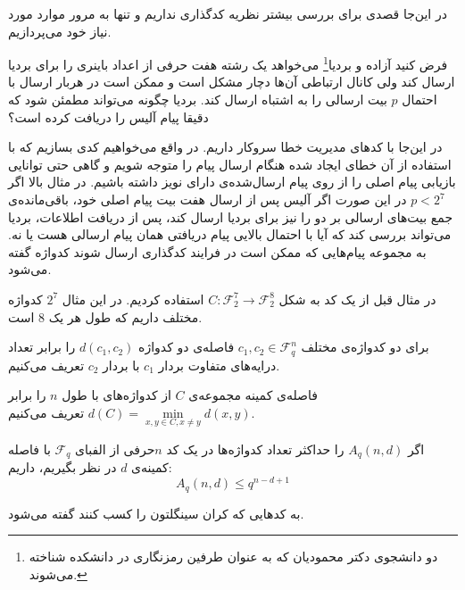 در این‌جا قصدی برای بررسی بیشتر نظریه کدگذاری نداریم و تنها به مرور موارد مورد نیاز خود می‌پردازیم.
\begin{example}
	فرض کنید آزاده و بردیا\footnote{دو دانشجوی دکتر محمودیان که به عنوان طرفین رمزنگاری در دانشکده شناخته می‌شوند.}
	 می‌خواهد یک رشته هفت حرفی از اعداد باینری را برای بردیا ارسال کند ولی کانال ارتباطی آن‌ها دچار مشکل است و ممکن است در هربار ارسال با احتمال
	$p$
	بیت ارسالی را به اشتباه ارسال کند. بردیا چگونه می‌تواند مطمئن شود که دقیقا پیام آلیس را دریافت کرده است؟
	
	در این‌جا با کدهای مدیریت خطا سروکار داریم. در واقع می‌خواهیم کدی بسازیم که با استفاده از آن خطای ایجاد شده هنگام ارسال پیام را متوجه شویم و گاهی حتی توانایی بازیابی پیام اصلی را از روی پیام ارسال‌شده‌ی دارای نویز داشته باشیم. در مثال بالا اگر
	$p < 2^7$
	در این صورت اگر آلیس پس از ارسال هفت بیت پیام اصلی خود، باقی‌مانده‌ی جمع بیت‌های ارسالی بر دو را نیز برای بردیا ارسال کند، پس از دریافت اطلاعات، بردیا می‌تواند بررسی کند که آیا با احتمال بالایی پیام دریافتی همان پیام ارسالی هست یا نه. به مجموعه‌ پیام‌هایی که ممکن است در فرایند کدگذاری ارسال شوند کدواژه گفته می‌شود.
	
	در مثال قبل از یک کد به شکل
	$C: \mathcal{F}_2^7 \rightarrow \mathcal{F}_2^8$
	استفاده کردیم. در این مثال
	$2^7$
	کدواژه مختلف داریم که طول هر یک
	$8$
	است.
\end{example}

\begin{definition}
	برای دو کدواژه‌ی مختلف
	$c_1, c_2 \in \mathcal{F}_q^n$
	فاصله‌ی دو کدواژه
	$d(c_1, c_2)$
	را برابر تعداد درایه‌های متفاوت بردار
	$c_1$
	با بردار
	$c_2$
	تعریف می‌کنیم.
	
	 فاصله‌‌ی کمینه مجموعه‌ی
	$C$
	از کدواژه‌های با طول
	$n$
	 را برابر
	$d(C) = \min\limits_{x, y \in C, x \ne y} d(x, y)$
	تعریف می‌کنیم.
\end{definition}

\begin{definition}
	اگر
	$A_q(n, d)$
	را حداکثر تعداد کدواژه‌ها در یک کد
	$n$حرفی
 از الفبای
	$\mathcal{F}_q$
	با فاصله کمینه‌ی 
	$d$
	در نظر بگیریم، داریم:
	\begin{equation}
		A_q(n, d) \leq q^{n - d + 1}
	\end{equation}
	\cite{wiki:Singleton}
\end{definition}
\begin{definition}
	\label{def:mds}
	به کدهایی که کران سینگلتون را کسب کنند گفته می‌شود.
\end{definition}

